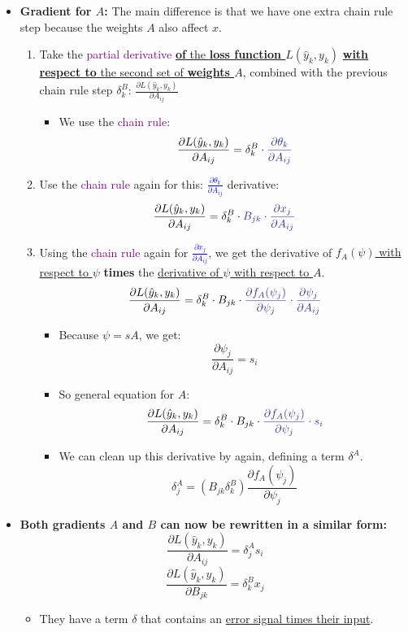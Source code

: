 \documentclass[12pt, a4paper]{article}
\begin{document}
\begin{itemize}
  \item \textbf{Gradient for $A$:} The main difference is that we have one extra chain rule step because the weights $A$ also affect $x$.
  \begin{enumerate}
    \item Take the \textcolor{Purple}{partial derivative} \uline{\textbf{of} the \textbf{loss function $L(\hat{y}_k, y_k)$}} \uline{\textbf{with respect to} the second set of \textbf{weights $A$}}, combined with the previous chain rule step $\delta_k^B$: $\frac{\partial L(\hat{y}_k, y_k)}{\partial A_{ij}}$
    \begin{itemize}
      \item We use the \textcolor{Purple}{chain rule}:
      $$
      \frac{\partial L(\hat{y}_k, y_k)}{\partial A_{ij}} = \delta_k^B \cdot \textcolor{Blue}{\frac{\partial \theta_k}{\partial A_{ij}}}
      $$
    \end{itemize}
    \item Use the \textcolor{Purple}{chain rule} again for this: \textcolor{Blue}{$\frac{\partial \theta_k}{\partial A_{ij}}$} derivative:
    $$
    \frac{\partial L(\hat{y}_k, y_k)}{\partial A_{ij}} = \delta_k^B \cdot \textcolor{Blue}{B_{jk} \cdot \frac{\partial x_j}{\partial A_{ij}}}
    $$
    \item Using the \textcolor{Purple}{chain rule} again for \textcolor{Blue}{$\frac{\partial x_j}{\partial A_{ij}}$}, we get the derivative of \uline{$f_A(\psi)$ with respect to $\psi$} \textbf{times} the \uline{derivative of $\psi$ with respect to $A$}.
    $$
    \frac{\partial L(\hat{y}_k, y_k)}{\partial A_{ij}} = \delta_k^B \cdot B_{jk} \cdot \textcolor{Blue}{\frac{\partial f_A(\psi_j)}{\partial \psi_j} \cdot \frac{\partial \psi_j}{\partial A_{ij}}}
    $$
    \begin{itemize}
      \item Because $\psi = sA$, we get:
      $$
      \frac{\partial \psi_j}{\partial A_{ij}} = s_i
      $$
      \item So general equation for $A$:
      $$
      \frac{\partial L(\hat{y}_k, y_k)}{\partial A_{ij}} = \delta_k^B \cdot B_{jk} \cdot \textcolor{Blue}{\frac{\partial f_A(\psi_j)}{\partial \psi_j} \cdot s_i}
      $$
      \item We can clean up this derivative by again, defining a term $\delta^A$.
      $$
      \delta_j^A = (B_{jk} \delta_k^B) \frac{\partial f_A(\psi_j)}{\partial \psi_j}
      $$
    \end{itemize}
  \end{enumerate}

  \item \textbf{Both gradients $A$ and $B$ can now be rewritten in a similar form:}
  $$
  \frac{\partial L(\hat{y}_k, y_k)}{\partial A_{ij}} = \delta_j^A s_i
  $$
  $$
  \frac{\partial L(\hat{y}_k, y_k)}{\partial B_{jk}} = \delta_k^B x_j
  $$
  \begin{itemize}
    \item They have a term $\delta$ that contains an \uline{error signal times their input}.
  \end{itemize}
\end{itemize}
\end{document}
